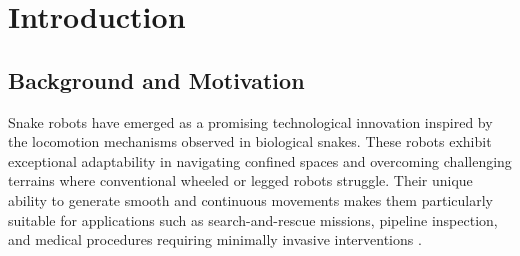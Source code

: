 \documentclass[12pt,a4paper]{report}
\begin{document}

\tableofcontents
\listoffigures
\listoftables


\chapter{Introduction}

\section{Background and Motivation}
Snake robots have emerged as a promising technological innovation inspired by the locomotion mechanisms observed in biological snakes. These robots exhibit exceptional adaptability in navigating confined spaces and overcoming challenging terrains where conventional wheeled or legged robots struggle. Their unique ability to generate smooth and continuous movements makes them particularly suitable for applications such as search-and-rescue missions, pipeline inspection, and medical procedures requiring minimally invasive interventions \textcite{transeth-2009, Hirose2004}.
\end{document}
